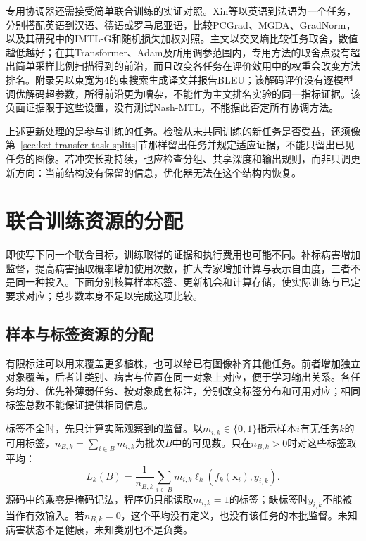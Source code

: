 专用协调器还需接受简单联合训练的实证对照。Xin等以英语到法语为一个任务，分别搭配英语到汉语、德语或罗马尼亚语，比较PCGrad、MGDA、GradNorm，以及其研究中的IMTL-G和随机损失加权对照。主文以交叉熵比较任务取舍，数值越低越好；在其Transformer、Adam及所用调参范围内，专用方法的取舍点没有超出简单采样比例扫描得到的前沿，而且改变各任务在评价效用中的权重会改变方法排名。附录另以束宽为4的束搜索生成译文并报告BLEU；该解码评价没有逐模型调优解码超参数，所得前沿更为嘈杂，不能作为主文排名实验的同一指标证据。该负面证据限于这些设置，没有测试Nash-MTL，不能据此否定所有协调方法。

上述更新处理的是参与训练的任务。检验从未共同训练的新任务是否受益，还须像第~\ref{sec:ket-transfer-task-splits}节那样留出任务并规定适应证据，不能只留出已见任务的图像。若冲突长期持续，也应检查分组、共享深度和输出规则，而非只调更新方向：当前结构没有保留的信息，优化器无法在这个结构内恢复。

\section{联合训练资源的分配}
\label{sec:ket-sharing-resources}

即使写下同一个联合目标，训练取得的证据和执行费用也可能不同。补标病害增加监督，提高病害抽取概率增加使用次数，扩大专家增加计算与表示自由度，三者不是同一种投入。下面分别核算样本标签、更新机会和计算存储，使实际训练与已定要求对应；总步数本身不足以完成这项比较。

\subsection{样本与标签资源的分配}
\label{sec:ket-sharing-labels}

有限标注可以用来覆盖更多植株，也可以给已有图像补齐其他任务。前者增加独立对象覆盖，后者让类别、病害与位置在同一对象上对应，便于学习输出关系。各任务均分、优先补薄弱任务、按对象成套标注，分别改变标签分布和可用对应；相同标签总数不能保证提供相同信息。

标签不全时，先只计算实际观察到的监督。以$m_{i,k}\in\{0,1\}$指示样本$i$有无任务$k$的可用标签，$n_{B,k}=\sum_{i\in B}m_{i,k}$为批次$B$中的可见数。只在$n_{B,k}>0$时对这些标签取平均：
\begin{equation}
  L_k(B)=
  \frac{1}{n_{B,k}}
  \sum_{i\in B}m_{i,k}
  \ell_k(f_k(\bm x_i),y_{i,k}).
  \label{eq:ket-sharing-label-mask}
\end{equation}
源码中的乘零是掩码记法，程序仍只能读取$m_{i,k}=1$的标签；缺标签时$y_{i,k}$不能被当作有效输入。若$n_{B,k}=0$，这个平均没有定义，也没有该任务的本批监督。未知病害状态不是健康，未知类别也不是负类。

